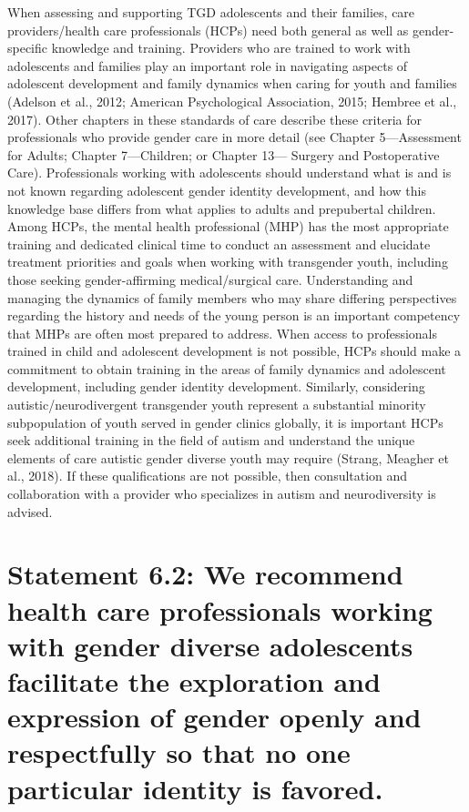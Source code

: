 \documentclass[
]{book}
\begin{document}
When assessing and supporting TGD adolescents and their families, care providers/health
care professionals (HCPs) need both general as
well as gender-specific knowledge and training.
Providers who are trained to work with adolescents and families play an important role in navigating aspects of adolescent development and
family dynamics when caring for youth and families (Adelson et al., 2012; American Psychological
Association, 2015; Hembree et al., 2017). Other
chapters in these standards of care describe these
criteria for professionals who provide gender care
in more detail (see Chapter 5---Assessment for
Adults; Chapter 7---Children; or Chapter 13---
Surgery and Postoperative Care). Professionals
working with adolescents should understand
what is and is not known regarding adolescent
gender identity development, and how this
knowledge base differs from what applies to
adults and prepubertal children. Among HCPs,
the mental health professional (MHP) has the
most appropriate training and dedicated clinical
time to conduct an assessment and elucidate
treatment priorities and goals when working with
transgender youth, including those seeking
gender-affirming medical/surgical care.
Understanding and managing the dynamics of
family members who may share differing perspectives regarding the history and needs of the
young person is an important competency that
MHPs are often most prepared to address.
When access to professionals trained in child
and adolescent development is not possible, HCPs
should make a commitment to obtain training in
the areas of family dynamics and adolescent development, including gender identity development.
Similarly, considering autistic/neurodivergent
transgender youth represent a substantial minority
subpopulation of youth served in gender clinics
globally, it is important HCPs seek additional
training in the field of autism and understand the
unique elements of care autistic gender diverse
youth may require (Strang, Meagher et al., 2018).
If these qualifications are not possible, then consultation and collaboration with a provider who
specializes in autism and neurodiversity is advised.

\hypertarget{statement-6.2-we-recommend-health-care-professionals-working-with-gender-diverse-adolescents-facilitate-the-exploration-and-expression-of-gender-openly-and-respectfully-so-that-no-one-particular-identity-is-favored.}{%
\section*{Statement 6.2: We recommend health care professionals working with gender diverse adolescents facilitate the exploration and expression of gender openly and respectfully so that no one particular identity is favored.}\label{statement-6.2-we-recommend-health-care-professionals-working-with-gender-diverse-adolescents-facilitate-the-exploration-and-expression-of-gender-openly-and-respectfully-so-that-no-one-particular-identity-is-favored.}}
\end{document}
